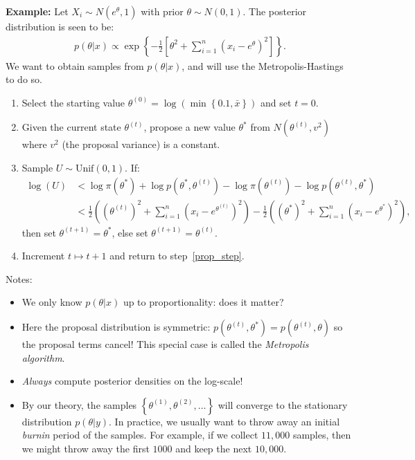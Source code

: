 \documentclass[11pt]{article}
\begin{document}
\begin{itemize}
\begin{itemize}
	\textbf{Example:} Let $X_{i}\sim{}N(e^{\theta},1)$ with prior $\theta\sim{}N(0,1)$. The posterior distribution is seen to be:
	\begin{align*}
	p(\theta|x) \propto \exp\left\{-\frac{1}{2}\left[\theta^{2}+\sum_{i=1}^{n}\left(x_{i}-e^{\theta}\right)^{2}\right]\right\} . 
	\end{align*} 
	We want to obtain samples from $p(\theta|x)$, and will use the Metropolis-Hastings to do so. 
	\begin{enumerate}
    \item Select the starting value $\theta^{(0)}=\log\left(\min\left\{0.1,\bar{x}\right\}\right)$ and set $t=0$.
    \item\label{prop_step} Given the current state $\theta^{(t)}$, propose a new value $\theta^{*}$ from $N(\theta^{(t)},v^{2})$ where $v^{2}$ (the proposal variance) is a constant. 
    \item Sample $U\sim{}\textrm{Unif}(0,1)$. If:
    \begin{align*}
    \log(U) &<  \log\pi(\theta^{*}) + \log{}p(\theta^{*},\theta^{(t)}) - \log{}\pi(\theta^{(t)}) - \log{}p(\theta^{(t)},\theta^{*})  \\
     &< \frac{1}{2}\left((\theta^{(t)})^{2}+\sum_{i=1}^{n}(x_{i}-e^{\theta^{(t)}})^{2}\right) - \frac{1}{2}\left((\theta^{*})^{2}+\sum_{i=1}^{n}(x_{i}-e^{\theta^{*}})^{2}\right) ,
    \end{align*}
    then set $\theta^{(t+1)}=\theta^{*}$, else set $\theta^{(t+1)}=\theta^{(t)}$. 
    \item Increment $t\mapsto{}t+1$ and return to step~\ref{prop_step}. 
    \end{enumerate}
    Notes:
    \begin{itemize}
    \item We only know $p(\theta|x)$ up to proportionality: does it matter?
    \item Here the proposal distribution is symmetric: $p(\theta^{(t)},\theta^{*})=p(\theta^{(t)},\theta)$ so the proposal terms cancel! This special case is called the \emph{Metropolis algorithm}. 
    \item \emph{Always} compute posterior densities on the log-scale!
    \item  By our theory, the samples $\left\{\theta^{(1)},\theta^{(2)},\ldots\right\}$ will converge to the stationary distribution $p(\theta|y)$. In practice, we usually want to throw away an initial \emph{burnin} period of the samples. For example, if we collect $11,000$ samples, then we might throw away the first $1000$ and keep the next $10,000$. 

\end{itemize}
\end{itemize}
\end{itemize}
\end{document}
